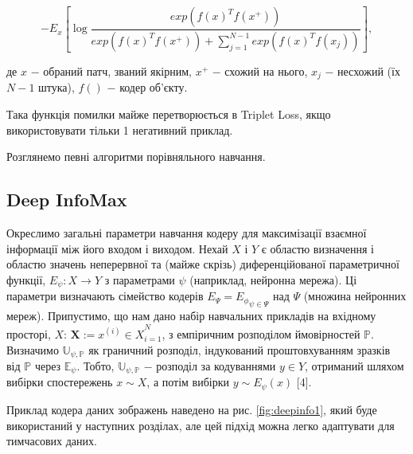 \begin{equation}\label{eq:infonce}
-E_{x}\left[ \log{\frac{exp(f(x)^{T}f(x^{+}))}{exp(f(x)^{T}f(x^{+}))+\sum_{j=1}^{N-1}exp(f(x)^{T}f(x_{j}))}} \right],
\end{equation}

\noindent де $x$ $-$ обраний патч, званий якірним, \newline
\hspace*{15pt} $x^{+}$ $-$ схожий на нього, \newline
\hspace*{15pt} $x_{j}$ $-$ несхожий (їх $N-1$ штука), \newline
\hspace*{15pt} $f()$ $-$ кодер об'єкту. 

\vspace{1.5em}

Така функція помилки майже перетворюється в Triplet Loss, якщо використовувати тільки 1 негативний приклад.

Розглянемо певні алгоритми порівняльного навчання.

\subsection{Deep InfoMax}

Окреслимо загальні параметри навчання кодеру для максимізації взаємної інформації між його входом і виходом. Нехай $X$ і $Y$ є областю визначення і областю значень неперервної та (майже скрізь) диференційованої параметричної функції, $E_{\psi}: X \rightarrow Y$ з параметрами $\psi$ (наприклад, нейронна мережа). Ці параметри визначають сімейство кодерів $E_{\Psi} = {E_{\phi}}_{\psi \in \Psi}$ над $\Psi$ (множина нейронних мереж). Припустимо, що нам дано набір навчальних прикладів на вхідному просторі, $X$: $\mathbf{X} := {x^{(i)} \in X}^{N}_{i = 1}$, з емпіричним розподілом ймовірностей $\mathbb{P}$. Визначимо $\mathbb{U_{\psi,P}}$ як граничний розподіл, індукований проштовхуванням зразків від $\mathbb{P}$ через $\mathbb{E_{\psi}}$. Тобто, $\mathbb{U_{\psi, P}}$ $-$ розподіл за кодуваннями $y \in Y$, отриманий шляхом вибірки спостережень $x \sim X$, а потім вибірки $y \sim E_{\psi}(x)$ [4].

Приклад кодера даних зображень наведено на рис. \ref{fig:deepinfo1}, який буде використаний у наступних розділах, але цей підхід можна легко адаптувати для тимчасових даних. 

\newpage

\vspace{1em}

